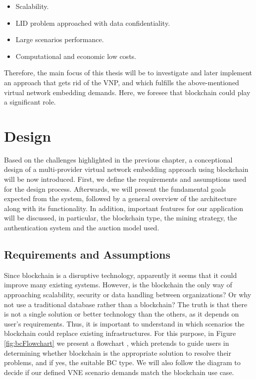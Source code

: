 \begin{itemize}
	\item Scalability.
	\item LID problem approached with data confidentiality.
	\item Large scenarios performance.
	\item Computational and economic low costs.
\end{itemize}

Therefore, the main focus of this thesis will be to investigate and later implement an approach that gets rid of the VNP, and which fulfills the above-mentioned virtual network embedding demands. Here, we foresee that blockchain could play a significant role.


\chapter{Design}
\label{ch:design}

Based on the challenges highlighted in the previous chapter, a conceptional design of a multi-provider virtual network embedding approach using blockchain will be now introduced. First, we define the requirements and assumptions used for the design process. Afterwards, we will present the fundamental goals expected from the system, followed by a general overview of the architecture along with its functionality. In addition, important features for our application will be discussed, in particular, the blockchain type, the mining strategy, the authentication system and the auction model used.

\section{Requirements and Assumptions} \label{requirements}

Since blockchain is a disruptive technology, apparently it seems that it could improve many existing systems. However, is the blockchain the only way of approaching scalability, security or data handling between organizations? Or why not use a traditional database rather than a blockchain? The truth is that there is not a single solution or better technology than the others, as it depends on user's requirements. Thus, it is important to understand in which scenarios the blockchain could replace existing infrastructures. For this purpose, in Figure \ref{fig:bcFlowchart} we present a flowchart \citep{wust2017you}, which pretends to guide users in determining whether blockchain is the appropriate solution to resolve their problems, and if yes, the suitable BC type. We will also follow the diagram to decide if our defined VNE scenario demands match the blockchain use case.

